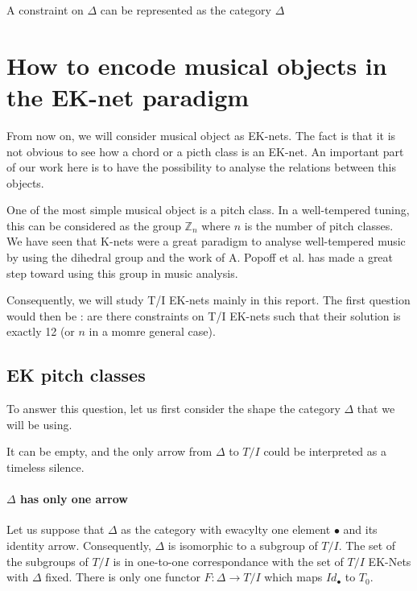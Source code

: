 A constraint on $\Delta$ can be represented as the category $\Delta$








\section{How to encode musical objects in the EK-net paradigm}

From now on, we will consider musical object as EK-nets. The fact is that it is not obvious to see how a chord or a picth class is an EK-net. An important part of our work here is to have the possibility to analyse the relations between this objects.

One of the most simple musical object is a pitch class. In a well-tempered tuning, this can be considered as the group $\mathbb{Z}_n$ where $n$ is the number of pitch classes. We have seen that K-nets were a great paradigm to analyse well-tempered music by using the dihedral group and the work of  A. Popoff et al.\cite{PAAE2016} has made a great step toward using this group in music analysis.

Consequently, we will study T/I EK-nets mainly in this report. The first question would then be : are there constraints on T/I EK-nets such that their  solution is exactly 12 (or $n$ in a momre general case).

\subsection{EK pitch classes}

To answer this question, let us first consider the shape the category $\Delta$ that we will be using.

It can be empty, and the only arrow from $\Delta$ to $T/I$ could be interpreted as a timeless silence.

\paragraph{$\Delta$ has only one arrow}
Let us suppose that $\Delta$ as the category with ewacylty one element $\bullet$ and its identity arrow. Consequently, $\Delta$ is isomorphic to a subgroup of $T/I$. The set of the subgroups of $T/I$ is in one-to-one correspondance with the set of $T/I$ EK-Nets with $\Delta$ fixed.
There is only one functor $F:\Delta \rightarrow T/I$ which maps $Id_\bullet$ to $T_0$.


